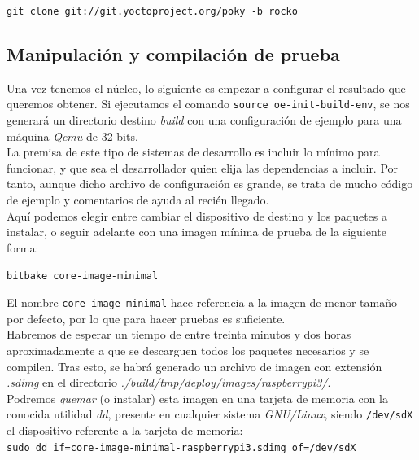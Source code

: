 \begin{center}
\texttt{git clone git://git.yoctoproject.org/poky -b rocko}
\end{center}

\subsection{Manipulación y compilación de prueba}

Una vez tenemos el núcleo, lo siguiente es empezar a configurar el resultado que queremos obtener. Si ejecutamos el comando \texttt{source oe-init-build-env}, se nos generará un directorio destino \textit{build} con una configuración de ejemplo para una máquina \textit{Qemu} de 32 bits.\\ 

La premisa de este tipo de sistemas de desarrollo es incluir lo mínimo para funcionar, y que sea el desarrollador quien elija las dependencias a incluir. Por tanto, aunque dicho archivo de configuración es grande, se trata de mucho código de ejemplo y comentarios de ayuda al recién llegado.\\

Aquí podemos elegir entre cambiar el dispositivo de destino y los paquetes a instalar, o seguir adelante con una imagen mínima de prueba de la siguiente forma:

\begin{center}
\texttt{bitbake core-image-minimal}
\end{center}

El nombre \texttt{core-image-minimal} hace referencia a la imagen de menor tamaño por defecto, por lo que para hacer pruebas es suficiente. \\

Habremos de esperar un tiempo de entre treinta minutos y dos horas aproximadamente a que se descarguen todos los paquetes necesarios y se compilen. Tras esto, se habrá generado un archivo de imagen con extensión \textit{.sdimg} en el directorio \textit{./build/tmp/deploy/images/raspberrypi3/}.\\

Podremos \textit{quemar} (o instalar) esta imagen en una tarjeta de memoria con la conocida utilidad \textit{dd}, presente en cualquier sistema \textit{GNU/Linux}, siendo \texttt{/dev/sdX} el dispositivo referente a la tarjeta de memoria:\\

\texttt{sudo dd if=core-image-minimal-raspberrypi3.sdimg of=/dev/sdX}\\

